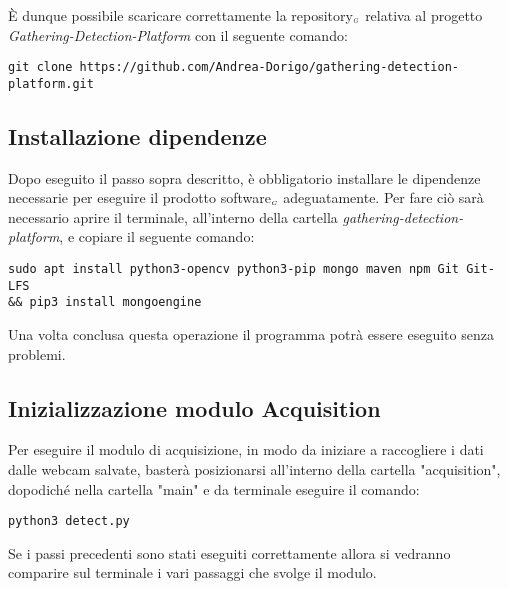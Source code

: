 È dunque possibile scaricare correttamente la repository$_{\scaleto{G}{3pt}}$ relativa al progetto \textit{Gathering-Detection-Platform} con il seguente comando:
\begin{lstlisting}
git clone https://github.com/Andrea-Dorigo/gathering-detection- platform.git
\end{lstlisting}

\subsection{Installazione dipendenze}\label{RequisitiDiSistemaEdInstallazioneInstallazioneInstallazioneDipendenze}
Dopo eseguito il passo sopra descritto, è obbligatorio installare le dipendenze necessarie per eseguire il prodotto software$_{\scaleto{G}{3pt}}$ adeguatamente.
Per fare ciò sarà necessario aprire il terminale, all'interno della cartella \textit{gathering-detection-platform}, e copiare il seguente comando:
\begin{lstlisting}
sudo apt install python3-opencv python3-pip mongo maven npm Git Git-LFS 
&& pip3 install mongoengine
\end{lstlisting}

Una volta conclusa questa operazione il programma potrà essere eseguito senza problemi.

\subsection{Inizializzazione modulo Acquisition}\label{RequisitiDiSistemaEdInstallazioneInstallazioneInizializzazioneModuloAcquisition}
Per eseguire il modulo di acquisizione, in modo da iniziare a raccogliere i dati dalle webcam salvate, basterà posizionarsi all'interno della cartella "acquisition", dopodiché nella cartella "main" e da terminale eseguire il comando:
\begin{lstlisting}
python3 detect.py
\end{lstlisting}
Se i passi precedenti sono stati eseguiti correttamente allora si vedranno comparire sul terminale i vari passaggi che svolge il modulo.



